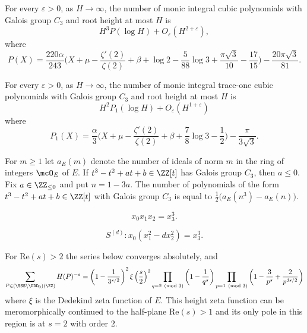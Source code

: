 \begin{theorem}\label{thm:generalMonicCount} For every $\varepsilon>0$, as $H\to\infty$, the number of monic integral cubic polynomials with Galois group $C_3$ and root height at most $H$ is \[ H^3P(\log H)+O_\varepsilon(H^{2+\varepsilon}), \] where \begin{equation} P(X)=\frac{220\alpha}{243} \biggl(X+\mu-\frac{\zeta'(2)}{\zeta(2)}+ \beta +\log2-\frac{5}{88}\log3 +\frac{\pi\sqrt3}{10}-\frac{17}{15}\biggr) -\frac{20\pi\sqrt3}{81}. \end{equation} \end{theorem}

\begin{theorem}\label{thm:asymptoticPolynomialCount} For every $\varepsilon>0$, as $H\to\infty$, the number of monic integral trace-one cubic polynomials with Galois group $C_3$ and root height at most $H$ is \[ H^2P_1(\log H)+O_\varepsilon(H^{1+\varepsilon}) \] where \begin{equation} P_1(X)=\frac\alpha3 \biggl(X+\mu-\frac{\zeta'(2)}{\zeta(2)} + \beta +\frac78\log3-\frac12\biggr) -\frac{\pi}{3\sqrt3}. \end{equation} \end{theorem}

\begin{theorem}\label{thm:exactFormula} For $m\geq1$ let $a_E(m)$ denote the number of ideals of norm $m$ in the ring of integers $\mcO_E$ of $E$. If $t^3-t^2+at+b\in\ZZ[t]$ has Galois group $C_3$, then $a\leq0$. Fix $a \in \ZZ_{\leq 0}$ and put $n=1-3a$. The number of polynomials of the form $t^3 -t^2 + at + b \in \ZZ[t]$ with Galois group $C_3$ is equal to $\tfrac{1}{2}\big(a_E(n^3)-a_E(n)\big)$. \end{theorem}

\begin{equation}\label{eqn:splitForm} x_0x_1x_2=x_3^3. \end{equation}

\begin{equation}\label{eqn:surfaceQuadraticTwist} S^{(d)}\colon x_0(x_1^2-dx_2^2)=x_3^3. \end{equation}

\begin{theorem}\label{thm:heightZetaFunctionFormula} For $\mathrm{Re}(s)>2$ the series below converges absolutely, and \begin{equation} \sum_{P \in (\SSS\setminus\DDD_0)(\ZZ)} H(P)^{-s} = \left(1-\frac{1}{3^{s/2}}\right)^2 \xi\left(\frac s2\right)^2 \prod_{q\equiv2\pmod{3}}\left(1-\frac{1}{q^{s}}\right) \prod_{p\equiv1\pmod{3}}\left(1-\frac{3}{p^{s}}+\frac{2}{p^{3s/2}}\right) \end{equation} where $\xi$ is the Dedekind zeta function of $E$. This height zeta function can be meromorphically continued to the half-plane $\mathrm{Re}(s)>1$ and its only pole in this region is at $s = 2$ with order $2$. \end{theorem}

